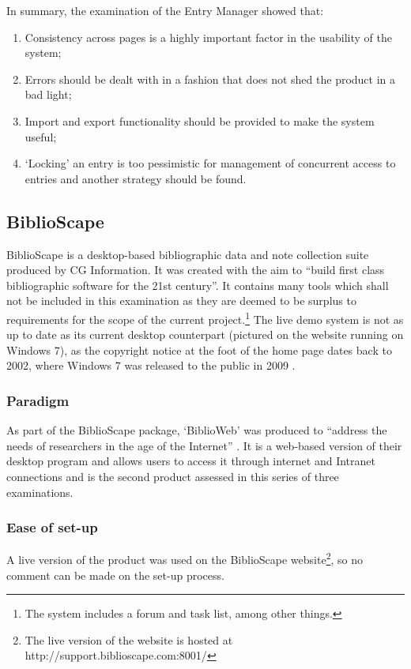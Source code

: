 In summary, the examination of the \bibtex{} Entry Manager showed that:
\begin{enumerate}
	\item Consistency across pages is a highly important factor in the usability of the system; 
	\item Errors should be dealt with in a fashion that does not shed the product in a bad light;
	\item Import and export functionality should be provided to make the system useful;
	\item `Locking' an entry is too pessimistic for management of concurrent access to entries and another strategy should be found.
\end{enumerate} 


\subsection{BiblioScape}
BiblioScape is a desktop-based bibliographic data and note collection suite produced by CG Information.  It was created with the aim to ``build first class bibliographic software for the 21st century''.  It contains many tools which shall not be included in this examination as they are deemed to be surplus to requirements for the scope of the current project.\footnote{The system includes a forum and task list, among other things.} The live demo system is not as up to date as its current desktop counterpart (pictured on the website running on Windows 7), as the copyright notice at the foot of the home page dates back to 2002, where Windows 7 was released to the public in 2009 \cite{Win7Release}.

\subsubsection{Paradigm}
As part of the BiblioScape package, `BiblioWeb' was produced to ``address the needs of researchers in the age of the Internet'' \cite{BiblioWebWhy}.  It is a web-based version of their desktop program and allows users to access it through internet and Intranet connections and is the second product assessed in this series of three examinations.

\subsubsection{Ease of set-up}
A live version of the product was used on the BiblioScape website\footnote{The live version of the website is hosted at http://support.biblioscape.com:8001/}, so no comment can be made on the set-up process.


